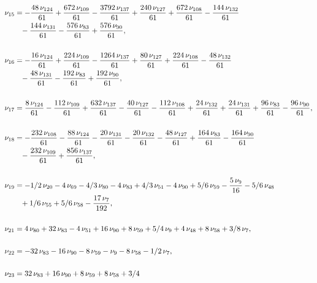 \documentclass[a4paper,12pt, DIV=14, BCOR=5mm, twoside, headsepline]{scrbook}
\begin{document}
\begin{align}\label{AreaSol3}
\begin{aligned}
\nu_{{15}}&=-{
\frac {48\,\nu_{{124}}}{61}}+{\frac {672\,\nu_{{109}}}{61}}-{\frac {
3792\,\nu_{{137}}}{61}}+{\frac {240\,\nu_{{127}}}{61}}+{\frac {672\,
\nu_{{108}}}{61}}-{\frac {144\,\nu_{{132}}}{61}}\\
 &\hphantom{=}-{\frac {144\,\nu_{{
131}}}{61}}-{\frac {576\,\nu_{{83}}}{61}}+{\frac {576\,\nu_{{90}}}{61}
}, \\
\\
\nu_{{16}}&=-{\frac {16\,\nu_{{124}}}{61}}+{\frac {224\,\nu_{{109}}}{
61}}-{\frac {1264\,\nu_{{137}}}{61}}+{\frac {80\,\nu_{{127}}}{61}}+{
\frac {224\,\nu_{{108}}}{61}}-{\frac {48\,\nu_{{132}}}{61}}\\
 &\hphantom{=}-{\frac {48
\,\nu_{{131}}}{61}}-{\frac {192\,\nu_{{83}}}{61}}+{\frac {192\,\nu_{{
90}}}{61}}, \\
\\
\nu_{{17}}&={\frac {8\,\nu_{{124}}}{61}}-{\frac {112\,\nu_{{
109}}}{61}}+{\frac {632\,\nu_{{137}}}{61}}-{\frac {40\,\nu_{{127}}}{61
}}-{\frac {112\,\nu_{{108}}}{61}}+{\frac {24\,\nu_{{132}}}{61}}+{
\frac {24\,\nu_{{131}}}{61}}+{\frac {96\,\nu_{{83}}}{61}}-{\frac {96\,
\nu_{{90}}}{61}}, \\
\\
\nu_{{18}}&=-{\frac {232\,\nu_{{108}}}{61}}-{\frac {88
\,\nu_{{124}}}{61}}-{\frac {20\,\nu_{{131}}}{61}}-{\frac {20\,\nu_{{
132}}}{61}}-{\frac {48\,\nu_{{127}}}{61}}+{\frac {164\,\nu_{{83}}}{61}
}-{\frac {164\,\nu_{{90}}}{61}}\\
 &\hphantom{=}-{\frac {232\,\nu_{{109}}}{61}}+{\frac 
{856\,\nu_{{137}}}{61}}, \\
\\
\nu_{{19}}&=-1/2\,\nu_{{20}}-4\,\nu_{{69}}-4/3
\,\nu_{{80}}-4\,\nu_{{83}}+4/3\,\nu_{{51}}-4\,\nu_{{90}}+5/6\,\nu_{{59
}}-{\frac {5\,\nu_{{9}}}{16}}-5/6\,\nu_{{48}}\\
 &\hphantom{=}+1/6\,\nu_{{55}}+5/6\,\nu
_{{58}}-{\frac {17\,\nu_{{7}}}{192}}, \\
\\
\nu_{{21}}&=4\,\nu_{{80}}+32\,\nu_
{{83}}-4\,\nu_{{51}}+16\,\nu_{{90}}+8\,\nu_{{59}}+5/4\,\nu_{{9}}+4\,
\nu_{{48}}+8\,\nu_{{58}}+3/8\,\nu_{{7}}, \\
\\
\nu_{{22}}&=-32\,\nu_{{83}}-16
\,\nu_{{90}}-8\,\nu_{{59}}-\nu_{{9}}-8\,\nu_{{58}}-1/2\,\nu_{{7}}, \\
\\
\nu_
{{23}}&=32\,\nu_{{83}}+16\,\nu_{{90}}+8\,\nu_{{59}}+8\,\nu_{{58}}+3/4\,

\end{aligned}
\end{align}
\end{document}
